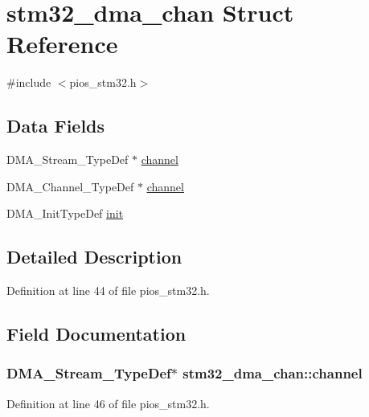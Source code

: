\hypertarget{structstm32__dma__chan}{\section{stm32\-\_\-dma\-\_\-chan \-Struct \-Reference}
\label{structstm32__dma__chan}
}


{\ttfamily \#include $<$pios\-\_\-stm32.\-h$>$}

\subsection*{\-Data \-Fields}
\begin{DoxyCompactItemize}
\item 
\-D\-M\-A\-\_\-\-Stream\-\_\-\-Type\-Def $\ast$ \hyperlink{structstm32__dma__chan_a17a0b808033d1fd3cdb23c379b2e8318}{channel}
\item 
\-D\-M\-A\-\_\-\-Channel\-\_\-\-Type\-Def $\ast$ \hyperlink{structstm32__dma__chan_a83c74feec82b3ebc787cab90df6b2264}{channel}
\item 
\-D\-M\-A\-\_\-\-Init\-Type\-Def \hyperlink{structstm32__dma__chan_a26b43c1f3ac4595c61a12d5bf54c39fb}{init}
\end{DoxyCompactItemize}


\subsection{\-Detailed \-Description}


\-Definition at line 44 of file pios\-\_\-stm32.\-h.



\subsection{\-Field \-Documentation}
\hypertarget{structstm32__dma__chan_a17a0b808033d1fd3cdb23c379b2e8318}{
\subsubsection[{channel}]{\setlength{\rightskip}{0pt plus 5cm}\-D\-M\-A\-\_\-\-Stream\-\_\-\-Type\-Def$\ast$ {\bf stm32\-\_\-dma\-\_\-chan\-::channel}}}\label{structstm32__dma__chan_a17a0b808033d1fd3cdb23c379b2e8318}


\-Definition at line 46 of file pios\-\_\-stm32.\-h.

